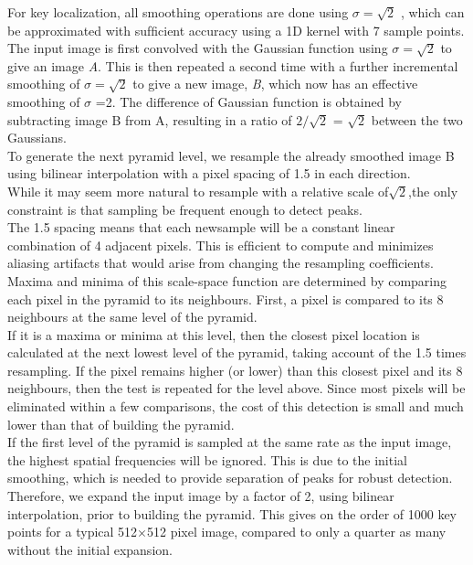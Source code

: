 For key localization, all smoothing operations are done using
$\sigma = \sqrt{2}$ , which can be approximated with sufﬁcient accuracy
using a 1D kernel with 7 sample points.\\
The input image is first convolved with the Gaussian
function using $\sigma = \sqrt{2}$ to give an image \textit{A}. This is then
repeated a second time with a further incremental smoothing
of $\sigma = \sqrt{2}$ to give a new image, \textit{B}, which now has an
effective smoothing of $\sigma$ =2. The difference of Gaussian
function is obtained by subtracting image B from A, resulting
in a ratio of $2/\sqrt{2}$ = $ \sqrt{2}$ between the two Gaussians.\\
To generate the next pyramid level, we resample the already smoothed image B using bilinear interpolation with a
pixel spacing of 1.5 in each direction.\\ While it may seem
more natural to resample with a relative scale of$\sqrt{2}$,the
only constraint is that sampling be frequent enough to detect
peaks.\\ The 1.5 spacing means that each newsample will
be a constant linear combination of 4 adjacent pixels. This
is efﬁcient to compute and minimizes aliasing artifacts that
would arise from changing the resampling coefﬁcients.\\
Maxima and minima of this scale-space function are determined
by comparing each pixel in the pyramid to its
neighbours. First, a pixel is compared to its 8 neighbours at
the same level of the pyramid.\\ If it is a maxima or minima
at this level, then the closest pixel location is calculated at
the next lowest level of the pyramid, taking account of the
1.5 times resampling. If the pixel remains higher (or lower)
than this closest pixel and its 8 neighbours, then the test is
repeated for the level above. Since most pixels will be eliminated
within a few comparisons, the cost of this detection is
small and much lower than that of building the pyramid.\\
If the first level of the pyramid is sampled at the same rate
as the input image, the highest spatial frequencies will be ignored.
This is due to the initial smoothing, which is needed
to provide separation of peaks for robust detection. Therefore,
we expand the input image by a factor of 2, using bilinear
interpolation, prior to building the pyramid. This gives
on the order of 1000 key points for a typical
512$\times$512 pixel
image, compared to only a quarter as many without the initial
expansion.

